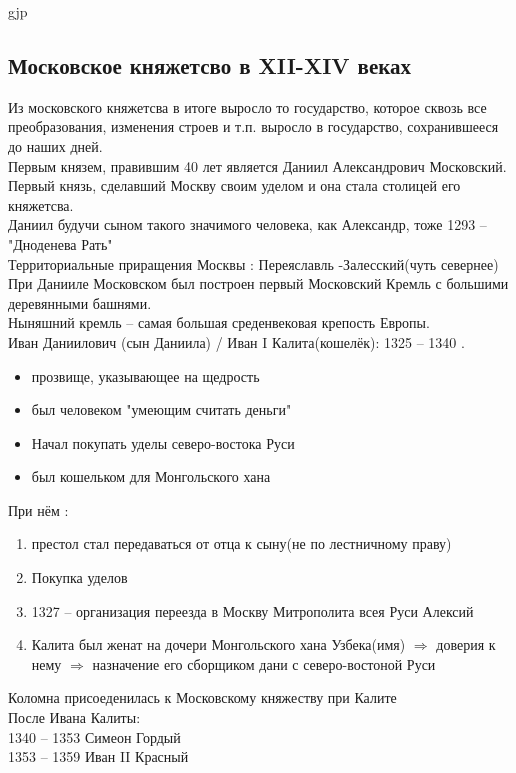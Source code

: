 gjp	 \documentclass[12pt,a4paper]{article}
\begin{document}
\subsection{Московское княжетсво в XII-XIV веках}
Из московского княжетсва в итоге выросло то государство, которое сквозь все преобразования, изменения строев и т.п. выросло  в государство, сохранившееся до наших дней.\\
Первым князем, правившим 40 лет  является Даниил Александрович Московский.\\
Первый князь, сделавший Москву своим уделом и она стала столицей его княжетсва.\\
Даниил будучи сыном такого значимого человека, как Александр, тоже 
1293 -- "Дноденева Рать"\\
Территориальные приращения Москвы : Переяславль -Залесский(чуть севернее)\\
При Данииле Московском был построен первый Московский Кремль с большими деревянными башнями.\\
Ныняшний кремль -- самая большая среденвековая крепость Европы.\\
Иван Даниилович (сын Даниила) / Иван I Калита(кошелёк): 1325 -- 1340 .\\
\begin{itemize}
	\item прозвище, указывающее на щедрость
	\item был человеком "умеющим считать деньги"
	\item Начал покупать уделы северо-востока Руси
	\item был кошельком для Монгольского хана
\end{itemize}
 При нём :
 \begin{enumerate}
	\item престол стал передаваться от отца к сыну(не по лестничному праву)
	\item Покупка уделов	
	\item 1327 -- организация переезда в Москву Митрополита всея Руси	Алексий
	\item Калита был женат на дочери Монгольского хана Узбека(имя) $\Rightarrow$ доверия к нему $\Rightarrow$ назначение его сборщиком дани с северо-востоной Руси
\end{enumerate}
Коломна присоеденилась к Московскому княжеству при Калите\\
После Ивана Калиты:\\
1340 -- 1353 Симеон Гордый\\
1353 -- 1359 Иван II Красный\\
\end{document}

